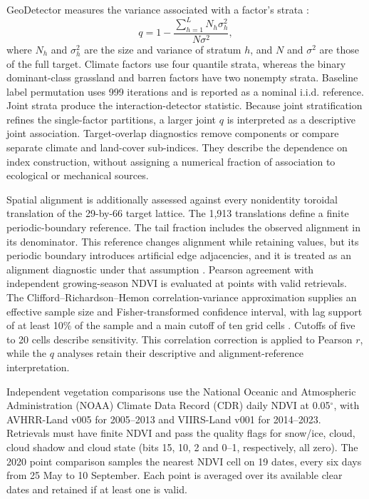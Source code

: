 \documentclass[preprint,11pt,authoryear]{elsarticle}
\begin{document}
GeoDetector measures the variance associated with a factor's strata \citep{wang2016measure,wang2012environmental}:
\begin{equation}
q=1-\frac{\sum_{h=1}^{L}N_h\sigma_h^2}{N\sigma^2},
\label{eq:q}
\end{equation}
where $N_h$ and $\sigma_h^2$ are the size and variance of stratum $h$, and $N$ and $\sigma^2$ are those of the full target. Climate factors use four quantile strata, whereas the binary dominant-class grassland and barren factors have two nonempty strata. Baseline label permutation uses 999 iterations and is reported as a nominal i.i.d. reference. Joint strata produce the interaction-detector statistic. Because joint stratification refines the single-factor partitions, a larger joint $q$ is interpreted as a descriptive joint association. Target-overlap diagnostics remove components or compare separate climate and land-cover sub-indices. They describe the dependence on index construction, without assigning a numerical fraction of association to ecological or mechanical sources.

Spatial alignment is additionally assessed against every nonidentity toroidal translation of the 29-by-66 target lattice. The 1,913 translations define a finite periodic-boundary reference. The tail fraction includes the observed alignment in its denominator. This reference changes alignment while retaining values, but its periodic boundary introduces artificial edge adjacencies, and it is treated as an alignment diagnostic under that assumption \citep{mrkvicka2021shift}. Pearson agreement with independent growing-season NDVI is evaluated at points with valid retrievals. The Clifford--Richardson--Hemon correlation-variance approximation supplies an effective sample size and Fisher-transformed confidence interval, with lag support of at least 10\% of the sample and a main cutoff of ten grid cells \citep{clifford1989spatial}. Cutoffs of five to 20 cells describe sensitivity. This correlation correction is applied to Pearson $r$, while the $q$ analyses retain their descriptive and alignment-reference interpretation.

Independent vegetation comparisons use the National Oceanic and Atmospheric Administration (NOAA) Climate Data Record (CDR) daily NDVI at 0.05$^\circ$, with AVHRR-Land v005 for 2005--2013 and VIIRS-Land v001 for 2014--2023. Retrievals must have finite NDVI and pass the quality flags for snow/ice, cloud, cloud shadow and cloud state (bits 15, 10, 2 and 0--1, respectively, all zero). The 2020 point comparison samples the nearest NDVI cell on 19 dates, every six days from 25 May to 10 September. Each point is averaged over its available clear dates and retained if at least one is valid.
\end{document}
